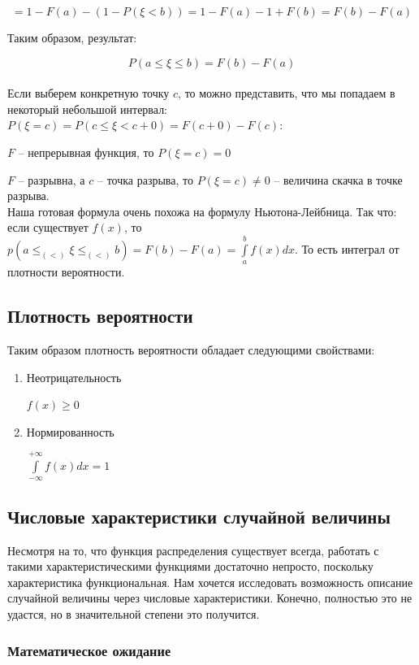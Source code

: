 \documentclass{article}
\begin{document}
$$ = 1 - F(a) - (1 - P(\xi < b)) = 1 - F(a) - 1 + F(b) = F(b) - F(a)$$

Таким образом, результат:

$$ P(a \leq \xi \leq b) = F(b) - F(a)$$
\\


Если выберем конкретную точку $c$, то можно представить, что мы попадаем в некоторый небольшой интервал: $P(\xi = c) = P(c \leq \xi < c + 0) = F(c + 0) - F(c)$:

 $F$ -- непрерывная функция, то $P(\xi = c) = 0$

 $F$ -- разрывна, а $c$ -- точка разрыва, то $P(\xi = c) \not= 0$ -- величина скачка в точке разрыва.
\\

Наша готовая формула очень похожа на формулу Ньютона-Лейбница. Так что:
если существует $f(x)$, то $p(a \leq_{(<)} \xi \leq_{(<)} b) = F(b) - F(a) = \int\limits_a^b f(x)dx$. То есть интеграл от плотности вероятности.

\subsection{Плотность вероятности}

Таким образом плотность вероятности обладает следующими свойствами:

\begin{enumerate}
\item Неотрицательность

\qquad$ f(x) \geq 0$

\item Нормированность

\qquad$ \int\limits_{-\infty}^{+\infty}f(x)dx = 1$

\end{enumerate}

\subsection{Числовые характеристики случайной величины}

Несмотря на то, что функция распределения существует всегда, работать с такими характеристическими функциями достаточно непросто, поскольку характеристика функциональная. Нам хочется исследовать возможность описание случайной величины через числовые характеристики. Конечно, полностью это не удастся, но в значительной степени это получится.

\subsubsection{Математическое ожидание}
\end{document}

